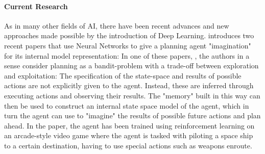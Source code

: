 \documentclass{article}
\theoremstyle{plain}
\theoremstyle{definition}
\theoremstyle{remark}
\begin{document}
\paragraph{Current Research}

As in many other fields of AI, there have been recent advances and new approaches made possible by the introduction of Deep Learning. \cite{deepmindblog} introduces two recent papers that use Neural Networks to give a planning agent "imagination" for its internal model representation: In one of these papers, \cite{pascanu2017learning}, the authors in a sense consider planning as a bandit-problem with a trade-off between exploration and exploitation: The specification of the state-space and results of possible actions are not explicitly given to the agent. Instead, these are inferred through executing actions and observing their results. The "memory" built in this way can then be used to construct an internal state space model of the agent, which in turn the agent can use to "imagine" the results of possible future actions and plan ahead. In the paper, the agent has been trained using reinforcement learning on an arcade-style video game where the agent is tasked with piloting a space ship to a certain destination, having to use special actions such as weapons enroute. 

\nocite{*}

\end{document}
